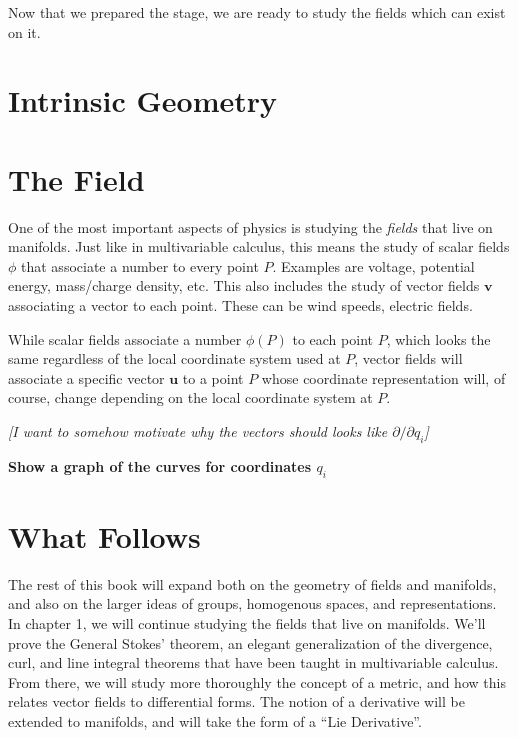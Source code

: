 	Now that we prepared the stage, we are ready to study the fields which can exist on it.  
	
	
	
	\section{Intrinsic Geometry} %
	\label{sec:intrinsic_geometry}
	
	
	\section{The Field} %
	\label{sec:the_field}
	
	One of the most important aspects of physics is studying the \emph{fields} that live on manifolds. Just like in multivariable calculus, this means the study of scalar fields $\phi$ that associate a number to every point $P$. Examples are voltage, potential energy, mass/charge density, etc. This also includes the study of vector fields $\mathbf v$ associating a vector to each point. These can be wind speeds, electric fields. 
	
	While scalar fields associate a number $\phi(P)$ to each point $P$, which looks the same regardless of the local coordinate system used at $P$, vector fields will associate a specific vector $\mathbf u$ to a point $P$ whose coordinate representation will, of course, change depending on the local coordinate system at $P$.
	
	
	
	{\emph{[I want to somehow motivate why the vectors should looks like $\partial/\partial q_i$]}}
	
	\textbf{Show a graph of the curves for coordinates $q_i$}
	
	\section{What Follows} %
	\label{sec:what_follows}
	
	The rest of this book will expand both on the geometry of fields and manifolds, and also on the larger ideas of groups, homogenous spaces, and representations. \\
	
	In chapter 1, we will continue studying the fields that live on manifolds. We'll prove the General Stokes' theorem, an elegant generalization of the divergence, curl, and line integral theorems that have been taught in multivariable calculus. From there, we will study more thoroughly the concept of a metric, and how this relates vector fields to differential forms. The notion of a derivative will be extended to manifolds, and will take the form of a ``Lie Derivative''.\\
	
